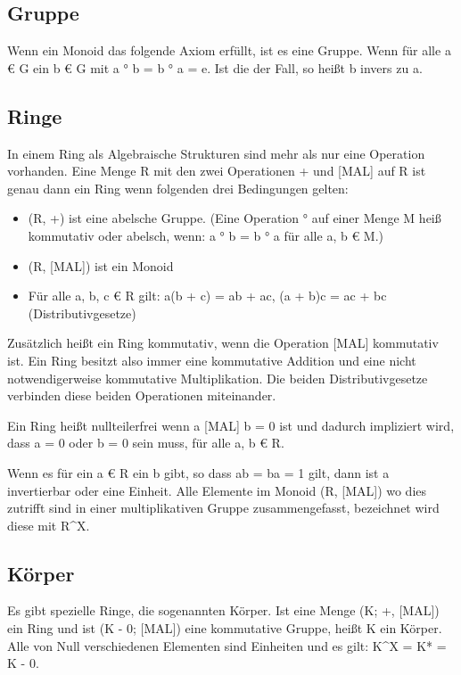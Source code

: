 		\subsection{Gruppe}
			Wenn ein Monoid das folgende Axiom erfüllt, ist es eine Gruppe. Wenn für alle a € G ein b € G mit a ° b = b ° a = e. Ist die der Fall, so heißt b invers zu a.
		
		\subsection{Ringe}
			In einem Ring als Algebraische Strukturen sind mehr als nur eine Operation vorhanden. Eine Menge R mit den zwei Operationen + und [MAL] auf R ist genau dann ein Ring wenn folgenden drei Bedingungen gelten:
			
			\begin{itemize}
				\item (R, +) ist eine abelsche Gruppe. (Eine Operation ° auf einer Menge M heiß kommutativ oder abelsch, wenn: a ° b = b ° a für alle a, b € M.)
				\item (R, [MAL]) ist ein Monoid
				\item Für alle a, b, c € R gilt: a(b + c) = ab + ac, (a + b)c = ac + bc (Distributivgesetze)
			\end{itemize}
			
			Zusätzlich heißt ein Ring kommutativ, wenn die Operation [MAL] kommutativ ist. Ein Ring besitzt also immer eine kommutative Addition und eine nicht notwendigerweise kommutative Multiplikation. Die beiden Distributivgesetze verbinden diese beiden Operationen miteinander.
			
			Ein Ring heißt nullteilerfrei wenn a [MAL] b = 0 ist und dadurch impliziert wird, dass a = 0 oder b = 0 sein muss, für alle a, b € R.
			
			Wenn es für ein a € R ein b gibt, so dass ab = ba = 1 gilt, dann ist a invertierbar oder eine Einheit. Alle Elemente im Monoid (R, [MAL]) wo dies zutrifft sind in einer multiplikativen Gruppe zusammengefasst, bezeichnet wird diese mit R^X.
			
		
		\subsection{Körper}
			Es gibt spezielle Ringe, die sogenannten Körper. Ist eine Menge (K; +, [MAL]) ein Ring und ist (K - {0}; [MAL]) eine kommutative Gruppe, heißt K ein Körper. Alle von Null verschiedenen Elementen sind Einheiten und es gilt: K^X = K* = K - {0}.
			
			